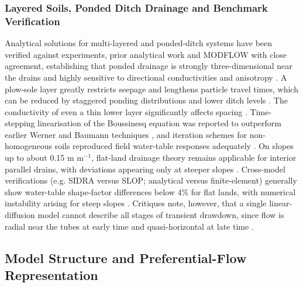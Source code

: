 \subsubsection{Layered Soils, Ponded Ditch Drainage and Benchmark Verification}

Analytical solutions for multi-layered and ponded-ditch systems have been verified against experiments, prior analytical work and MODFLOW with close agreement, establishing that ponded drainage is strongly three-dimensional near the drains and highly sensitive to directional conductivities and anisotropy \parencite{Chakrabarti2020,Sarmah2015,SHARMA1991,Afruzi2014}. A plow-sole layer greatly restricts seepage and lengthens particle travel times, which can be reduced by staggered ponding distributions and lower ditch levels \parencite{Chakrabarti2020,Sarmah2015}. The conductivity of even a thin lower layer significantly affects spacing \parencite{SHARMA1991}. Time-stepping linearisation of the Boussinesq equation was reported to outperform earlier Werner and Baumann techniques \parencite{Lin2025}, and iteration schemes for non-homogeneous soils reproduced field water-table responses adequately \parencite{CHU1977}. On slopes up to about 0.15 m m$^{-1}$, flat-land drainage theory remains applicable for interior parallel drains, with deviations appearing only at steeper slopes \parencite{FIPPS1989}. Cross-model verifications (e.g. SIDRA versus SLOP; analytical versus finite-element) generally show water-table shape-factor differences below 4\% for flat lands, with numerical instability arising for steep slopes \parencite{LORRE1994,Nédélec2010}. Critiques note, however, that a single linear-diffusion model cannot describe all stages of transient drawdown, since flow is radial near the tubes at early time and quasi-horizontal at late time \parencite{Kacimov2000}.

\subsection{Model Structure and Preferential-Flow Representation}

